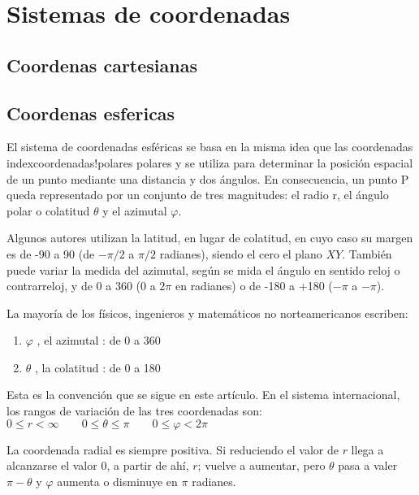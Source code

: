 \documentclass[a4paper]{book}
\begin{document}
\appendix
{}
\setcounter{page}{1}
\chapter{Sistemas de coordenadas}

\section{Coordenas cartesianas}
\section{Coordenas esfericas}


El sistema de coordenadas esféricas se basa en la misma idea que las coordenadas index{coordenadas!polares} polares y se utiliza para determinar la posición espacial de un punto mediante una distancia y dos ángulos. En consecuencia, un punto P queda representado por un conjunto de tres magnitudes: el radio r, el ángulo polar o colatitud $\theta$  y el azimutal $\varphi$.

Algunos autores utilizan la latitud, en lugar de colatitud, en cuyo caso su margen es de -90 a 90 (de $-\pi/2$ a $\pi/2$ radianes), siendo el cero el plano $XY$. También puede variar la medida del azimutal, según se mida el ángulo en sentido reloj o contrarreloj, y de 0 a 360 (0 a $2\pi$ en radianes) o de -180 a +180 ($-\pi$ a $-\pi$).

La mayoría de los físicos, ingenieros y matemáticos no norteamericanos escriben:

\begin{enumerate}
  \item $\varphi$ , el azimutal  : de 0 a 360
  \item $\theta$ , la colatitud : de 0 a 180
\end{enumerate}
Esta es la convención que se sigue en este artículo. En el sistema internacional, los rangos de variación de las tres coordenadas son:
$0\leq r<\infty \qquad 0\leq \theta \leq \pi \qquad 0\leq \varphi <2\pi$

La coordenada radial es siempre positiva. Si reduciendo el valor de $r$ llega a alcanzarse el valor 0, a partir de ahí, $r$; vuelve a aumentar, pero $\theta$  pasa a valer $\pi-\theta$  y $\varphi$  aumenta o disminuye en $\pi$ radianes.
\end{document}
